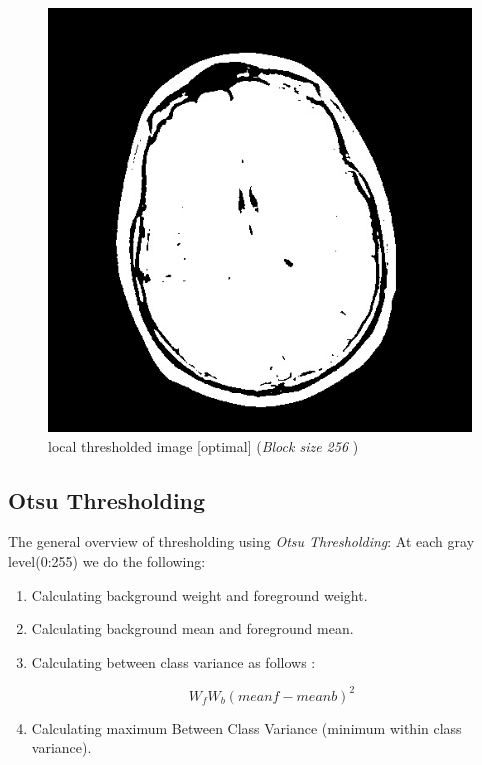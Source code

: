 \documentclass[letterpaper, 12 pt, conference ,onecolumn]{ieeeconf}  %
\begin{document}
\begin{figure}[h!]
\includegraphics[width=0.4\paperwidth]{optimal-thresholding/local/MRI-local-threshold256.jpg}
\centering
\caption{local thresholded image [optimal] (\textit{Block size 256 }) }
\label{fig:MRI-local-threshold256}
\end{figure} 


\subsection*{Otsu Thresholding} 
The general overview of thresholding  using \textit{Otsu Thresholding}:
At each gray level(0:255) we do the following: 
\begin{enumerate}
\item Calculating background weight and foreground weight.
\item Calculating background mean and foreground mean.
\item Calculating between class variance as follows : 

\begin{equation} \label{betweenclassvaraince_eqn}
{W_f}{W_b}{{(meanf-meanb)}^2}
\end{equation}

\item Calculating maximum Between Class Variance (minimum within class variance). 
\end{enumerate} 
\end{document}
